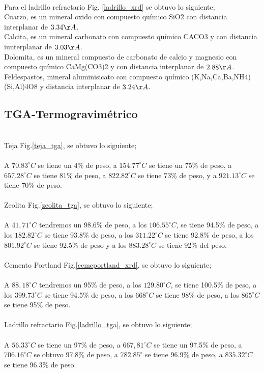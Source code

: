\documentclass[a4paper, 11pt]{article}
\begin{document}
\\
Para el ladrillo refractario Fig. \ref{ladrillo_xrd} se obtuvo lo siguiente;\\
Cuarzo, es un mineral oxido con compuesto químico SiO2 con distancia interplanar de $3.34\AA$.\\
Calcita, es un mineral carbonato con compuesto químico CACO3 y con distancia iunterplanar de $3.03\AA$.\\
Dolomita, es un mineral compuesto de carbonato de calcio y magnesio con compuesto químico CaMg(CO3)2 y con distancia interplanar de $2.88\AA$.\\
Feldespastos, mineral aluminisicato con compuesto químico (K,Na,Ca,Ba,NH4)(Si,Al)4O8   y distancia interplanar de $3.24\AA$.\\



\subsection{TGA-Termogravimétrico}
\
\\
Teja Fig.\ref{teja_tga}, se obtuvo lo siguiente;\\
\\
A $70.83^{\circ}C$ se tiene un 4\% de peso, a $154.77^{\circ}C$ se tiene un 75\% de peso, a $657.28^{\circ}C$ se tiene 81\% de peso, a $822.82^{\circ}C$ se tiene 73\% de peso, y a $921.13^{\circ}C$ se tiene 70\% de peso.
\\
\\
Zeolita Fig.\ref{zeolita_tga}, se obtuvo lo siguiente;\\
\\
A $41,71^{\circ}C$ tendremos un 98.6\% de peso, a los $106.55^{\circ}C$, se tiene 94.5\% de peso, a los $182.82^{\circ}C$ se tiene 93.8\% de peso, a los $311.22^{\circ}C$ se tiene 92.8\% de peso, a los $801.92^{\circ}C$ se tiene 92.5\% de peso y a los $883.28^{\circ}C$ se tiene 92\% del peso.
\\
\\
Cemento Portland Fig.\ref{cemeportland_xrd}, se obtuvo lo siguiente;\\
\\
A $88,18^{\circ}C$ tendremos un 95\% de peso, a los $129.80^{\circ}C$, se tiene 100.5\% de peso, a los $399.73^{\circ}C$ se tiene 94.5\% de peso, a los $668^{\circ}C$ se tiene 98\% de peso, a los $865^{\circ}C$ se tiene 95\% de peso.
\\
\\
Ladrillo refractario Fig.\ref{ladrillo_tga}, se obtuvo lo siguiente;\\
\\
A $56.33^{\circ}C$ se tiene un 97\% de peso, a $667,81^{\circ}C$ se tiene un 97.5\% de peso, a $706.16^{\circ}C$ se obtuvo 97.8\% de peso, a $782.85^{\circ}$ se tiene 96.9\% de peso, a $835.32^{\circ}C$ se tiene 96.3\% de peso.
\end{document}
